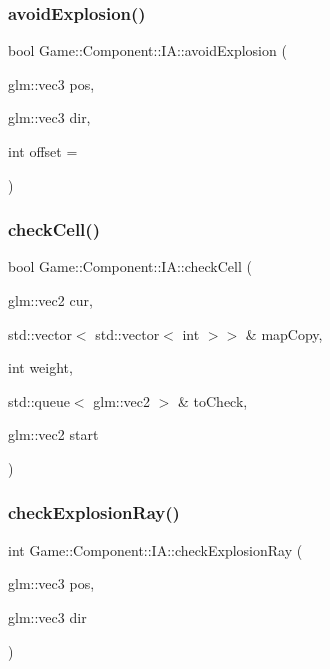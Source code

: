 \subsubsection{\texorpdfstring{avoid\+Explosion()}{avoidExplosion()}}
{\footnotesize\ttfamily bool Game\+::\+Component\+::\+I\+A\+::avoid\+Explosion (\begin{DoxyParamCaption}\item[{glm\+::vec3}]{pos,  }\item[{glm\+::vec3}]{dir,  }\item[{int}]{offset = {} }\end{DoxyParamCaption})\hspace{0.3cm}{\ttfamily [protected]}}

\mbox{\label{class_game_1_1_component_1_1_i_a_afb045de0879ac649137bfac7c11e3c52}} 
\subsubsection{\texorpdfstring{check\+Cell()}{checkCell()}}
{\footnotesize\ttfamily bool Game\+::\+Component\+::\+I\+A\+::check\+Cell (\begin{DoxyParamCaption}\item[{glm\+::vec2}]{cur,  }\item[{std\+::vector$<$ std\+::vector$<$ int $>$$>$ \&}]{map\+Copy,  }\item[{int}]{weight,  }\item[{std\+::queue$<$ glm\+::vec2 $>$ \&}]{to\+Check,  }\item[{glm\+::vec2}]{start }\end{DoxyParamCaption})\hspace{0.3cm}{\ttfamily [protected]}}

\mbox{\label{class_game_1_1_component_1_1_i_a_a006b992ca7952c4977a04febbc19f882}} 
\subsubsection{\texorpdfstring{check\+Explosion\+Ray()}{checkExplosionRay()}}
{\footnotesize\ttfamily int Game\+::\+Component\+::\+I\+A\+::check\+Explosion\+Ray (\begin{DoxyParamCaption}\item[{glm\+::vec3}]{pos,  }\item[{glm\+::vec3}]{dir }\end{DoxyParamCaption})\hspace{0.3cm}{\ttfamily [protected]}}

